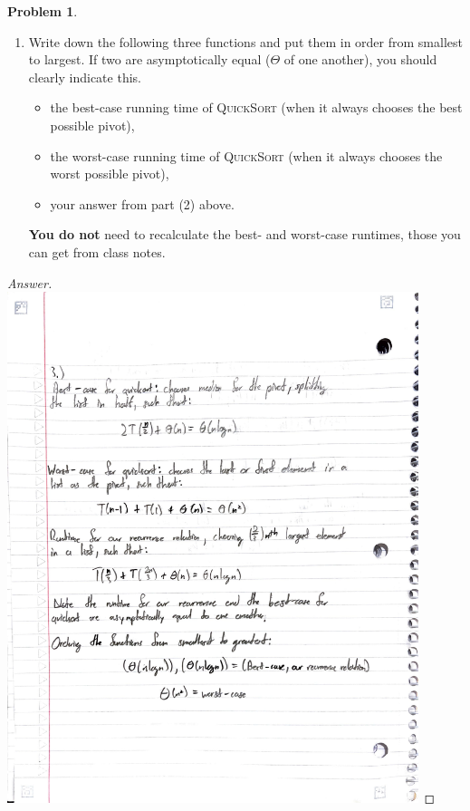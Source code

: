 \documentclass[11pt]{article}
\theoremstyle{definition}
\theoremstyle{definition}
\newtheorem{required}{Problem}
\theoremstyle{definition}
\begin{document}
\begin{required}
\begin{enumerate}
\item Write down the following three functions and put them in order from smallest to largest. If two are asymptotically equal ($\Theta$ of one another), you should clearly indicate this.
\begin{itemize}
\item the best-case running time of \textsc{QuickSort} (when it always chooses the best possible pivot), 
\item the worst-case running time of \textsc{QuickSort} (when it always chooses the worst possible pivot), 
\item your answer from part (2) above. 
\end{itemize}
\textbf{You do not} need to recalculate the best- and worst-case runtimes, those you can get from class notes. 
\end{enumerate}

\end{required}


\begin{proof}[Answer]

\includegraphics[width=0.9\textwidth]{M2S20P3.pdf}

\end{proof}




\end{document}

